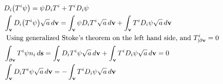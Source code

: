 \documentclass{article}[draft]
\begin{document}
\begin{align*}
	&D_i \of {T^i \psi} = \psi D_i T^i + T^i D_i \psi \\
	&\int_{\vect{v}} D_i \of {T^i \psi} \sqrt{a} \diff{\vect{v}} = \int_{\vect{v}} \psi D_i T^i \sqrt{a} \diff{\vect{v}} + \int_{\vect{v}} T^i D_i \psi \sqrt{a} \diff{\vect{v}}\\
	&\text{ Using generalized Stoke's theorem on the left hand side, and $T^i_{|\partial\vect{v}} = 0$} \\
	&\int_{\partial \vect{v}} T^i \psi n_i \diff{\vect{s}}  = \int_{\vect{v}} D_i T^i \psi  \sqrt{a} \diff{\vect{v}} + \int_{\vect{v}} T^i D_i \psi \sqrt{a} \diff{\vect{v}} = 0 \\
	&\int_{\vect{v}} D_i T^i \psi  \sqrt{a} \diff{\vect{v}} = - \int_{\vect{v}} T^i D_i \psi \sqrt{a} \diff{\vect{v}}
\end{align*}
\end{document}
